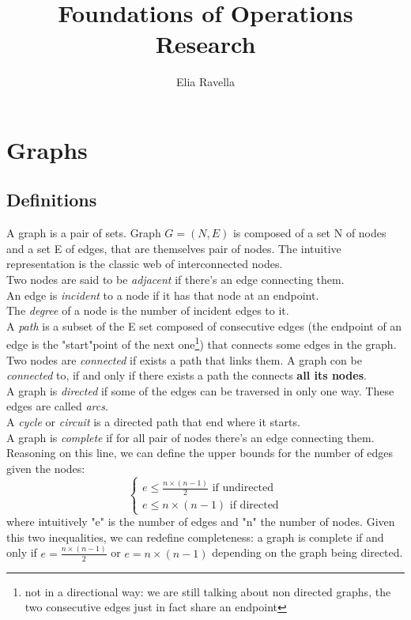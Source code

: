 \documentclass{article}
\title{Foundations of Operations Research}
\author{Elia Ravella}
\begin{document}
	\begin{titlepage}
		\maketitle
	\end{titlepage}
	
	\tableofcontents
	\clearpage

	\section{Graphs}
		\subsection{Definitions}
			A graph is a pair of sets. Graph $G = (N, E)$ is composed of a set N of nodes and a set E of edges, that are themselves pair of nodes. The intuitive representation is the classic web of interconnected nodes.\\
			Two nodes are said to be \textit{adjacent} if there's an edge connecting them.\\
			An edge is \textit{incident} to a node if it has that node at an endpoint.\\
			The \textit{degree} of a node is the number of incident edges to it.\\
			A \textit{path} is a subset of the E set composed of consecutive edges (the endpoint of an edge is the "start"point of the next one\footnote{not in a directional way: we are still talking about non directed graphs, the two consecutive edges just in fact share an endpoint}) that connects some edges in the graph.\\
			Two nodes are \textit{connected} if exists a path that links them. A graph con be \textit{connected} to, if and only if there exists a path the connects \textbf{all its nodes}.\\
			A graph is \textit{directed} if some of the edges can be traversed in only one way. These edges are called \textit{arcs}.\\
			A \textit{cycle} or \textit{circuit} is a directed path that end where it starts.\\
			A graph is \textit{complete} if for all pair of nodes there's an edge connecting them. Reasoning on this line, we can define the upper bounds for the number of edges given the nodes:
			\begin{equation}
				\begin{cases}
					e \leq \frac{n \times (n-1)}{2} \text{ if undirected} \\
					e \leq n \times (n-1) \text{ if directed}
				\end{cases}
			\end{equation}
			where intuitively "e" is the number of edges and "n" the number of nodes. Given this two inequalities, we can redefine completeness: a graph is complete if and only if $e = \frac{n \times (n - 1)}{2}$ or $e = n \times (n - 1)$ depending on the graph being directed.
\end{document}
